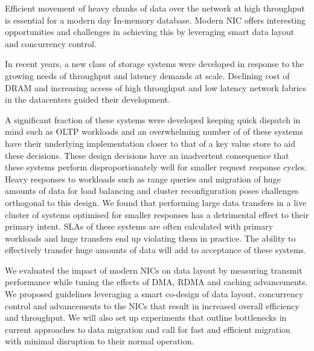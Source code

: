 

Efficient movement of heavy chunks of data over the network at high throughput 
is essential for a modern day In-memory database. Modern NIC offers interesting
opportunities and challenges in achieving this by leveraging smart data layout
and concurrency control.

In recent years, a new class of storage systems were developed in response to the growing needs of throughput
and latency demands at scale. Declining cost of DRAM and increasing access of 
high throughput and low latency network fabrics in the datacenters guided their development.

A significant fraction of these systems were developed keeping quick dispatch in mind
such as OLTP workloads and an overwhelming number of of these systems have their underlying
implementation closer to that of a key value store to aid these decisions. These design 
decisions have an inadvertent consequence that these systems perform disproportionately
well for smaller request response cycles. Heavy responses to workloads such as range queries
and migration of huge amounts of data for load balancing and cluster reconfiguration
poses challenges orthogonal to this design. We found that performing large data transfers in a live cluster 
of systems optimised for smaller responses has a detrimental effect to their primary intent. 
SLAs of these systems are often calculated with primary workloads and huge transfers end 
up violating them in practice. The ability to effectively transfer huge amounts of
data will add to acceptance of these systems.

We evaluated the impact of modern NICs on data layout by measuring transmit performance
while tuning the effects of DMA, RDMA and caching advancements. We proposed guidelines
leveraging a smart co-design of data layout, concurrency control and advancements to the
NICs that result in increased overall efficiency and throughput. We will also set up experiments
that outline bottlenecks in current approaches to data migration and call for fast and 
efficient migration with minimal disruption to their normal operation.